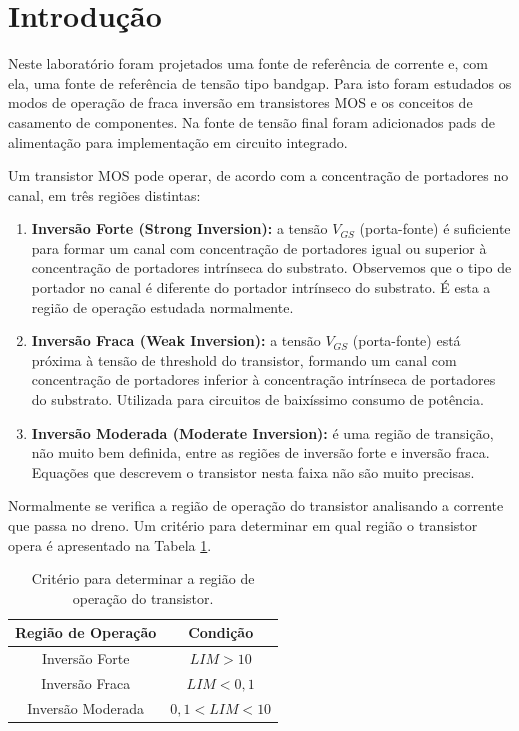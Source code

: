 ﻿\documentclass[12pt,a4paper]{article}
\begin{document}
\newpage
\hypersetup{pageanchor=true}
\tableofcontents
\newpage

\section*{Introdução}

Neste laboratório foram projetados uma fonte de referência de corrente e, com ela, uma fonte de referência de tensão tipo bandgap. Para isto foram estudados os modos de operação de fraca inversão em transistores MOS e os conceitos de casamento de componentes. Na fonte de tensão final foram adicionados pads de alimentação para implementação em circuito integrado.

Um transistor MOS pode operar, de acordo com a concentração de portadores no canal, em três regiões distintas:

\begin{enumerate}
    \item \textbf{Inversão Forte (Strong Inversion):} a tensão $V_{GS}$ (porta-fonte) é suficiente para formar um canal com concentração de portadores igual ou superior à concentração de portadores intrínseca do substrato. Observemos que o tipo de portador no canal é diferente do portador intrínseco do substrato. É esta a região de operação estudada normalmente.

    \item \textbf{Inversão Fraca (Weak Inversion):} a tensão $V_{GS}$ (porta-fonte) está próxima à tensão de threshold do transistor, formando um canal com concentração de portadores inferior à concentração intrínseca de portadores do substrato. Utilizada para circuitos de baixíssimo consumo de potência.

    \item \textbf{Inversão Moderada (Moderate Inversion):} é uma região de transição, não muito bem definida, entre as regiões de inversão forte e inversão fraca. Equações que descrevem o transistor nesta faixa não são muito precisas.
\end{enumerate}

Normalmente se verifica a região de operação do transistor analisando a corrente que passa no dreno. Um critério para determinar em qual região o transistor opera é apresentado na Tabela \ref{tab:operacao}.

\begin{table}[H]
\centering
\caption{Critério para determinar a região de operação do transistor.}
\label{tab:operacao}
\begin{tabular}{cc}
\toprule
\textbf{Região de Operação} & \textbf{Condição} \\
\midrule
Inversão Forte & $LIM > 10$ \\
Inversão Fraca & $LIM < 0,1$ \\
Inversão Moderada & $0,1 < LIM < 10$ \\
\bottomrule
\end{tabular}
\end{table}
\end{document}
